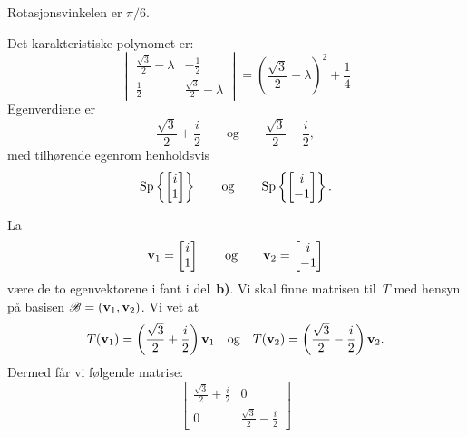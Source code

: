 \begin{losning}
\begin{punkt}
Rotasjonsvinkelen er $\pi/6$.
\end{punkt}
\begin{punkt}
Det karakteristiske polynomet er:
\[
\begin{vmatrix}
\frac{\sqrt{3}}{2} - \lambda & -\frac{1}{2}                 \\
\frac{1}{2}                  & \frac{\sqrt{3}}{2} - \lambda
\end{vmatrix}
=
\left( \frac{\sqrt{3}}{2} - \lambda \right)^2 + \frac{1}{4}
\]
Egenverdiene er
\[
\frac{\sqrt{3}}{2} + \frac{i}{2}
\qquad\text{og}\qquad
\frac{\sqrt{3}}{2} - \frac{i}{2},
\]
med tilhørende egenrom henholdsvis
\[
\operatorname{Sp} \left\{ \begin{bmatrix} i \\ 1 \end{bmatrix} \right\}
\qquad\text{og}\qquad
\operatorname{Sp} \left\{ \begin{bmatrix} i \\ -1 \end{bmatrix} \right\}.
\]
\end{punkt}
\begin{punkt}
La
\[
\mathbf{v}_1 = \begin{bmatrix} i \\ 1 \end{bmatrix}
\qquad\text{og}\qquad
\mathbf{v}_2 = \begin{bmatrix} i \\ -1 \end{bmatrix}
\]
være de to egenvektorene i fant i del~\textbf{b)}.  Vi skal finne
matrisen til~$T$ med hensyn på basisen $\mathscr{B} = (\mathbf{v}_1, \mathbf{v}_2)$.  Vi vet at
\[
T(\mathbf{v}_1) = \left( \frac{\sqrt{3}}{2} + \frac{i}{2} \right) \mathbf{v}_1
\quad\text{og}\quad
T(\mathbf{v}_2) = \left( \frac{\sqrt{3}}{2} - \frac{i}{2} \right) \mathbf{v}_2.
\]
Dermed får vi følgende matrise:
\[
\begin{bmatrix}
\frac{\sqrt{3}}{2} + \frac{i}{2} & 0 \\
0 & \frac{\sqrt{3}}{2} - \frac{i}{2}
\end{bmatrix}
\]
\end{punkt}
\end{losning}







